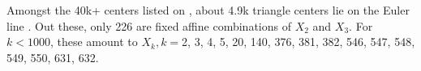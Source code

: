 Amongst the 40k+ centers listed on \cite{etc}, about 4.9k triangle centers lie on the Euler line \cite{etc-central-lines}. Out these, only 226 are fixed affine combinations of $X_2$ and $X_3$. For $k<1000$, these amount to $X_k,k=${\small 2, 3, 4, 5, 20, 140, 376, 381, 382, 546, 547, 548, 549, 550, 631, 
632}.